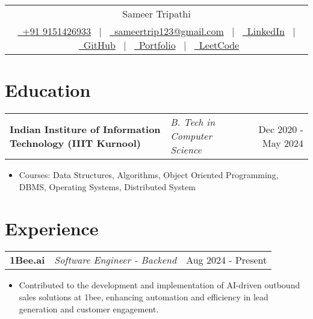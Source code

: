 \documentclass[a4paper,10pt]{article}
\makeatletter
\newenvironment{joblong}[3]
    {
    \begin{tabularx}{\linewidth}{@{}l X r@{}}
    \textbf{#1} & \textit{#2} &  #3 \\[3pt]
    \end{tabularx}
    \begin{minipage}[t]{\linewidth}
    \begin{itemize}[nosep,after=\strut, leftmargin=1em, itemsep=2pt,label=--]
    }
    {
    \end{itemize}
    \end{minipage}    
    }
\makeatother
\begin{document}
\pagestyle{empty} 


\begin{tabularx}{\linewidth}{@{} C @{}}
\Huge{Sameer Tripathi} \\[8pt]
\href{tel:+919151426933}{\ +91 9151426933} \ $|$ \
\href{mailto:sameertrip123@gmail.com}{\ sameertrip123@gmail.com} \ $|$ \
\href{https://linkedin.com/in/sameertri039}{\ LinkedIn} \ $|$ \ 
\href{https://github.com/sameertrip123}{\ GitHub} \ $|$ \ 
\href{https://sameertrip123.github.io/portfolio/}{\ Portfolio}  \ $|$ \ 
\href{https://leetcode.com/u/sameertri039/}{\ LeetCode} \\
\end{tabularx}


\section{Education}
\vspace{-4pt}
\begin{joblong}{Indian Institure of Information Technology (IIIT Kurnool)}{B. Tech in Computer Science}{Dec 2020 - May 2024}
    \item Courses: Data Structures, Algorithms, Object Oriented Programming, DBMS, Operating Systems, Distributed System
\end{joblong}
\vspace{-16pt}

\section{Experience}
\vspace{-4pt}
\begin{joblong}{1Bee.ai}{Software Engineer - Backend}{Aug 2024 - Present}
    \item Contributed to the development and implementation of AI-driven outbound sales solutions at 1bee, enhancing automation and efficiency in lead generation and customer engagement.
\end{joblong}
\end{document}
